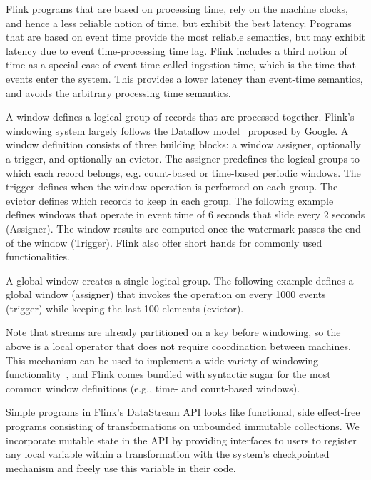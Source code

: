 Flink programs that are based on processing time, rely on the machine clocks, and hence a less reliable notion of time, but exhibit the best latency. Programs that are based on event time provide the most reliable semantics, but may exhibit latency due to event time-processing time lag. Flink includes a third notion of time as a special case of event time called ingestion time, which is the time that events enter the system. This provides  a lower latency than event-time semantics, and avoids the arbitrary processing time semantics.

 A window defines a logical group of records that are processed together. Flink's windowing system largely follows the Dataflow model~\cite{akidau2015dataflow} proposed by Google. A window definition consists of three building blocks: a window assigner, optionally a trigger, and optionally an evictor. 
The assigner predefines the logical groups to which each record belongs, e.g. count-based or time-based periodic windows. The trigger defines when the window operation is performed on each group. The evictor defines which records to keep in each group. The following example defines windows that operate in event time of 6 seconds that slide every 2 seconds (Assigner). The window results are computed once the watermark passes the end of the window (Trigger). Flink also offer short hands for commonly used functionalities.



A global window creates a single logical group. The following example defines a global window (assigner) that invokes the operation on every 1000 events (trigger) while keeping the last 100 elements (evictor). 

Note that streams are already partitioned on a key before windowing, so the above is a local operator that does not require coordination between machines. This mechanism can be used to implement a wide variety of windowing functionality~\cite{akidau2015dataflow}, and Flink comes bundled with syntactic sugar for the most common window definitions (e.g., time- and count-based windows). 

Simple programs in Flink's DataStream API looks like functional, side effect-free programs consisting of transformations on unbounded immutable collections. We incorporate mutable state in the API by providing interfaces to users to register any local variable within a transformation with the system's checkpointed mechanism and freely use this variable in their code. 
